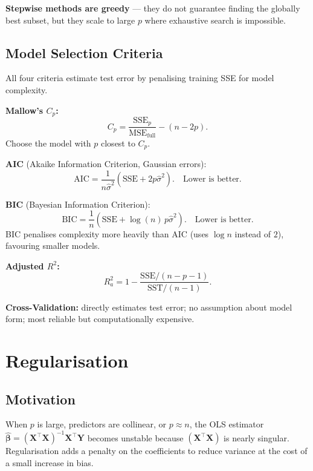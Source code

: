 \documentclass[12pt, a4paper]{article}
\begin{document}
\begin{keybox}
\noindent\textbf{Stepwise methods are greedy} — they do not guarantee finding the globally best subset, but they scale to large $p$ where exhaustive search is impossible.
\end{keybox}

\subsection{Model Selection Criteria}

All four criteria estimate test error by penalising training SSE for model complexity.

\textbf{Mallow's $C_p$:}
\[
  C_p = \frac{\text{SSE}_p}{\text{MSE}_\text{full}} - (n - 2p).
\]
Choose the model with $p$ closest to $C_p$.

\textbf{AIC} (Akaike Information Criterion, Gaussian errors):
\[
  \text{AIC} = \frac{1}{n\hat{\sigma}^2}(\text{SSE} + 2p\hat{\sigma}^2). \quad \text{Lower is better.}
\]

\textbf{BIC} (Bayesian Information Criterion):
\[
  \text{BIC} = \frac{1}{n}(\text{SSE} + \log(n)\,p\hat{\sigma}^2). \quad \text{Lower is better.}
\]
BIC penalises complexity more heavily than AIC (uses $\log n$ instead of $2$), favouring smaller models.

\textbf{Adjusted $R^2$:}
\[
  R_a^2 = 1 - \frac{\text{SSE}/(n-p-1)}{\text{SST}/(n-1)}.
\]

\textbf{Cross-Validation:} directly estimates test error; no assumption about model form; most reliable but computationally expensive.

\section{Regularisation}

\subsection{Motivation}

When $p$ is large, predictors are collinear, or $p \approx n$, the OLS estimator $\hat{\boldsymbol{\beta}} = (\mathbf{X}^\top\mathbf{X})^{-1}\mathbf{X}^\top\mathbf{Y}$ becomes unstable because $(\mathbf{X}^\top\mathbf{X})$ is nearly singular. Regularisation adds a penalty on the coefficients to reduce variance at the cost of a small increase in bias.
\end{document}
